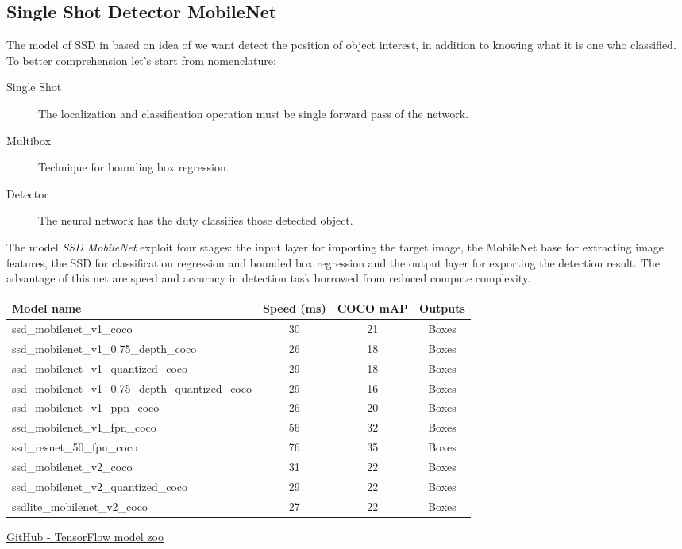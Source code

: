 \subsection{Single Shot Detector MobileNet}
\label{ssec:single-shot-detector}
The model of SSD in based on idea of we want detect the position of object
interest, in addition to knowing what it is one who classified. To better
comprehension let's start from nomenclature:
\begin{description}
\item[Single Shot] The localization and classification operation must be single forward pass of the network.
\item[Multibox] Technique for bounding box regression.
\item[Detector] The neural network has the duty classifies those detected object.
\end{description}
%
The model \emph{SSD MobileNet} exploit four stages: the input layer for
importing the target image, the MobileNet base for extracting image features,
the SSD for classification regression and bounded box regression and the output
layer for exporting the detection result.\cite{Li_2018} 
The advantage of this net are speed and accuracy in detection task borrowed from
reduced compute complexity.
%
\begin{table}[htb]
	\centering
	\begin{tabular}{l c c c}
	\hline
		Model name								&Speed (ms)	& COCO mAP\footnotemark	& Outputs\\
		\hline
		ssd\_mobilenet\_v1\_coco					&	30		&	21		&	Boxes\\
		ssd\_mobilenet\_v1\_0.75\_depth\_coco 		&	26		&	18		&	Boxes\\
		ssd\_mobilenet\_v1\_quantized\_coco 		&	29		&	18		&	Boxes\\
	ssd\_mobilenet\_v1\_0.75\_depth\_quantized\_coco 	&	29		&	16		&	Boxes\\
		ssd\_mobilenet\_v1\_ppn\_coco 				&	26		&	20		&	Boxes\\
		ssd\_mobilenet\_v1\_fpn\_coco 				&	56		&	32		&	Boxes\\
		ssd\_resnet\_50\_fpn\_coco 					&	76		&	35		&	Boxes\\
		ssd\_mobilenet\_v2\_coco					&	31		&	22		&	Boxes\\
		ssd\_mobilenet\_v2\_quantized\_coco			&	29		&	22		&	Boxes\\
		ssdlite\_mobilenet\_v2\_coco				&	27		&	22		&	Boxes\\
		\hline
	\end{tabular}
	{\href{https://github.com/tensorflow/models/blob/master/research/object_detection/g3doc/detection_model_zoo.md}{GitHub - TensorFlow model zoo}}
	\label{tab:mobilent-timing}
\end{table}
